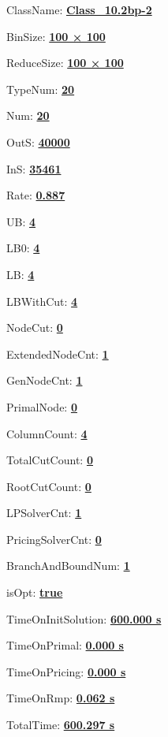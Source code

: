 \documentclass[11pt]{article}
\begin{document}
\pagestyle{empty}


ClassName: \underline{\textbf{Class_10.2bp-2}}
\par
BinSize: \underline{\textbf{100 × 100}}
\par
ReduceSize: \underline{\textbf{100 × 100}}
\par
TypeNum: \underline{\textbf{20}}
\par
Num: \underline{\textbf{20}}
\par
OutS: \underline{\textbf{40000}}
\par
InS: \underline{\textbf{35461}}
\par
Rate: \underline{\textbf{0.887}}
\par
UB: \underline{\textbf{4}}
\par
LB0: \underline{\textbf{4}}
\par
LB: \underline{\textbf{4}}
\par
LBWithCut: \underline{\textbf{4}}
\par
NodeCut: \underline{\textbf{0}}
\par
ExtendedNodeCnt: \underline{\textbf{1}}
\par
GenNodeCnt: \underline{\textbf{1}}
\par
PrimalNode: \underline{\textbf{0}}
\par
ColumnCount: \underline{\textbf{4}}
\par
TotalCutCount: \underline{\textbf{0}}
\par
RootCutCount: \underline{\textbf{0}}
\par
LPSolverCnt: \underline{\textbf{1}}
\par
PricingSolverCnt: \underline{\textbf{0}}
\par
BranchAndBoundNum: \underline{\textbf{1}}
\par
isOpt: \underline{\textbf{true}}
\par
TimeOnInitSolution: \underline{\textbf{600.000 s}}
\par
TimeOnPrimal: \underline{\textbf{0.000 s}}
\par
TimeOnPricing: \underline{\textbf{0.000 s}}
\par
TimeOnRmp: \underline{\textbf{0.062 s}}
\par
TotalTime: \underline{\textbf{600.297 s}}
\par
\newpage


\end{document}
